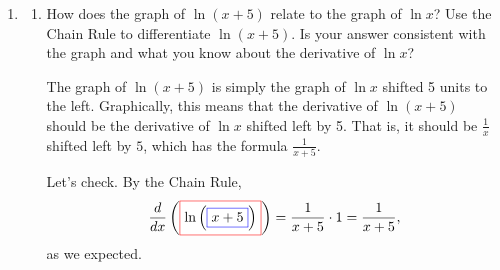 \documentclass{article}
\begin{document}
\begin{enumerate}
\begin{enumerate}
  \item
    \begin{problem}[\stretch{2}]
      $j(x) = [\ln (7x^2 + 3)]^5$
    \end{problem}

    \begin{solution}
      \begin{align*}
        j'(x) = {} & \frac{d}{dx}
        \left(\fcolorbox{red}{white}{$\displaystyle
            \fcolorbox{blue}{white}{$\displaystyle \ln\left(7 x^ { 2} +
                3\right)$}^ { 5} $}\right) \\
        = {} & 5 \left[ \ln\left(7 x^ { 2} + 3\right) \right]^ { 4} \cdot
        \frac{d}{dx} \left(\fcolorbox{red}{white}{$\displaystyle
            \ln\left(\fcolorbox{blue}{white}{$\displaystyle 7 x^ { 2} +
                3$}\right)$}\right) \\
        = {} & 5 \left[ \ln\left(7 x^ { 2} + 3\right) \right]^ { 4}
        \left(\frac{1}{7 x^ { 
              2} + 3}\cdot 14 x\right)
      \end{align*}
    \end{solution}

  \end{enumerate}

\item 

  \begin{enumerate}
  \item 
    \begin{problem}[\stretch{2}]
      How does the graph of $\ln(x + 5)$ relate to the graph of $\ln x$?
      Use the Chain Rule to differentiate $\ln (x + 5)$.  Is your answer
      consistent with the graph and what you know about the derivative of
      $\ln x$?
    \end{problem}

    \begin{solution}
      The graph of $\ln(x + 5)$ is simply the graph of $\ln x$ shifted 5
      units to the left.  Graphically, this means that the derivative of
      $\ln(x + 
      5)$ should be the derivative of $\ln x$ shifted left by 5.  That is,
      it should be $\frac{1}{x}$ shifted left by $5$, which has the
      formula $\frac{1}{x + 5}$. 

      Let's check.  By the Chain Rule,
      \[ \frac{d}{dx} \left(\fcolorbox{red}{white}{$\displaystyle
          \ln\left(\fcolorbox{blue}{white}{$\displaystyle x+
              5$}\right)$}\right) = \frac{1}{x+ 5}\cdot 1 = \frac{1}{x +
        5},\]
      as we expected.        
    \end{solution}


\end{enumerate}
\end{enumerate}
\end{document}
